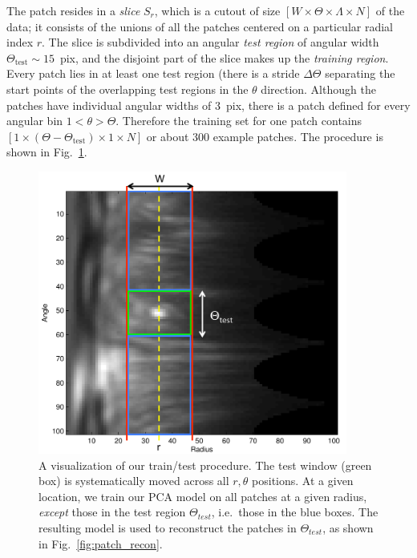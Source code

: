 \documentclass[12pt,pdftex,preprint]{aastex}
\newcommand{\test}{\mathrm{test}}
\newcommand{\fig}[1]{Fig.\ \ref{fig:#1}}
\begin{document}
The patch resides in a \emph{slice} $S_r$, which is a cutout of size
$[W\times\Theta\times\Lambda\times N]$ of the data; it consists of the
unions of all the patches centered on a particular radial index $r$.
The slice is subdivided into an angular \emph{test region} of angular
width $\Theta_\test\sim 15$~pix, and the disjoint part of the slice
makes up the \emph{training region}.  Every patch lies in at least one
test region (there is a stride $\Delta\Theta$ separating the start
points of the overlapping test regions in the $\theta$ direction.
Although the patches have individual angular widths of 3~pix, there is
a patch defined for every angular bin $1 < \theta > \Theta$.
Therefore the training set for one patch contains
$[1\times(\Theta-\Theta_\test)\times 1\times N]$ or about 300 example
patches. The procedure is shown in \fig{traintest}.

\begin{figure}[h!]
\begin{center}
\includegraphics[width=4in]{figs/explain.pdf}
\end{center}
\vspace{-7mm}
\caption{A visualization of our train/test procedure. The test window
  (green box) is systematically moved across all $r,\theta$
  positions. At a given location, we train our PCA model on all
  patches at a given radius, {\em except} those in the test region
  $\Theta_{test}$, i.e.~those in the blue boxes. The resulting model
  is used to reconstruct the patches in $\Theta_{test}$, as shown in \fig{patch_recon}. }
\label{fig:traintest}
\end{figure}
\end{document}
